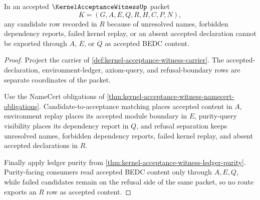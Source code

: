 \begin{theorem}
\label{thm:kernel-acceptance-witness-refusal-separation}
In an accepted $\KernelAcceptanceWitnessUp$ packet
$$
K=(G,A,E,Q,R,H,C,P,N),
$$
any candidate row recorded in $R$ because of unresolved names, forbidden dependency reports, failed kernel replay, or an absent accepted declaration cannot be exported through $A$, $E$, or $Q$ as accepted BEDC content.
\end{theorem}
\begin{proof}
Project the carrier of \autoref{def:kernel-acceptance-witness-carrier}. The accepted-declaration, environment-ledger, axiom-query, and refusal-boundary rows are separate coordinates of the packet.

Use the NameCert obligations of \autoref{thm:kernel-acceptance-witness-namecert-obligations}. Candidate-to-acceptance matching places accepted content in $A$, environment replay places its accepted module boundary in $E$, purity-query visibility places its dependency report in $Q$, and refusal separation keeps unresolved names, forbidden dependency reports, failed kernel replay, and absent accepted declarations in $R$.

Finally apply ledger purity from \autoref{thm:kernel-acceptance-witness-ledger-purity}. Purity-facing consumers read accepted BEDC content only through $A,E,Q$, while failed candidates remain on the refusal side of the same packet, so no route exports an $R$ row as accepted content.
\end{proof}


